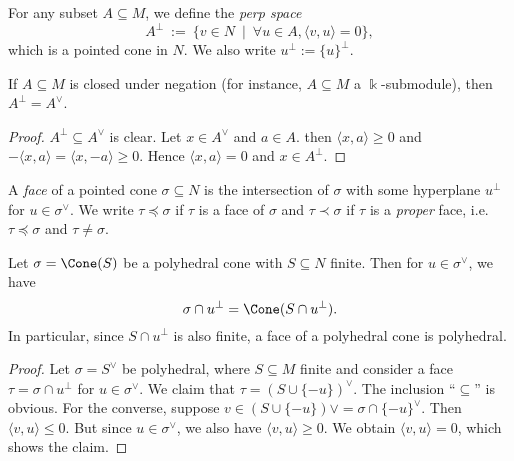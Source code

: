 \begin{definition}
  \label{3-perp}
  \uses{}
  For any subset \( A \subseteq M \), we define the \emph{perp space}
  \[
      A^{\perp}\ :=\ \{v \in N\ \mid\ \forall u \in A, \langle v, u \rangle = 0\},
  \]
  which is a pointed cone in \( N \). We also write \( u^{\perp} :=
  \{u\}^{\perp} \).
\end{definition}

\begin{lemma}
  \label{3-perp-closed-negation}
  \uses{}
  If \( A \subseteq M \) is closed under negation (for instance, \( A
  \subseteq M \) a \( \Bbbk \)-submodule), then \( A^{\perp} =
  A^{\vee} \).
\end{lemma}
\begin{proof}
  \uses{}
  \( A^{\perp} \subseteq A^{\vee} \) is clear. Let \( x \in A^{\vee}
  \) and \( a \in A \). then \( \langle x, a \rangle \geq 0 \) and \(
  -\langle x, a \rangle = \langle x, -a \rangle \geq 0 \). Hence \(
  \langle x, a \rangle = 0 \) and \( x \in A^{\perp} \).
\end{proof}


\begin{definition}
  \label{3-face}
  A \emph{face} of a pointed cone \( \sigma \subseteq N \) is the
  intersection of \( \sigma \) with some hyperplane \( u^{\perp} \)
  for \( u \in \sigma^{\vee} \). We write \( \tau \preceq \sigma \) if
  \( \tau \) is a face of \( \sigma \) and \( \tau \prec \sigma \) if
  \( \tau \) is a \emph{proper} face, i.e. \( \tau \preceq \sigma \)
  and \( \tau \neq \sigma \).
\end{definition}

\begin{proposition}
  \label{3-face-polyhedral}
  Let \( \sigma = \Cone(S) \) be a polyhedral cone with \( S \subseteq
  N \) finite. Then for \( u \in \sigma^{\vee} \), we have
  \[
      \sigma \cap u^{\perp} = \Cone(S \cap u^{\perp}).
  \]
  In particular, since \( S \cap u^{\perp} \) is also finite, a face
  of a polyhedral cone is polyhedral.
\end{proposition}
\begin{proof}
    Let \( \sigma = S^{\vee} \) be polyhedral, where \( S \subseteq M
    \) finite and consider a face \( \tau = \sigma \cap u^{\perp} \)
    for \( u \in \sigma^{\vee} \). We claim that \( \tau = (S \cup
    \{-u\})^\vee \). The inclusion ``\( \subseteq \)'' is obvious. For
    the converse, suppose \( v \in (S \cup \{-u\})\vee = \sigma \cap
    \{-u\}^\vee \). Then \( \langle v, u \rangle \leq 0 \). But since
    \( u \in \sigma^{\vee} \), we also have \( \langle v, u \rangle
    \geq 0 \). We obtain \( \langle v, u \rangle = 0 \), which shows
    the claim.
\end{proof}

